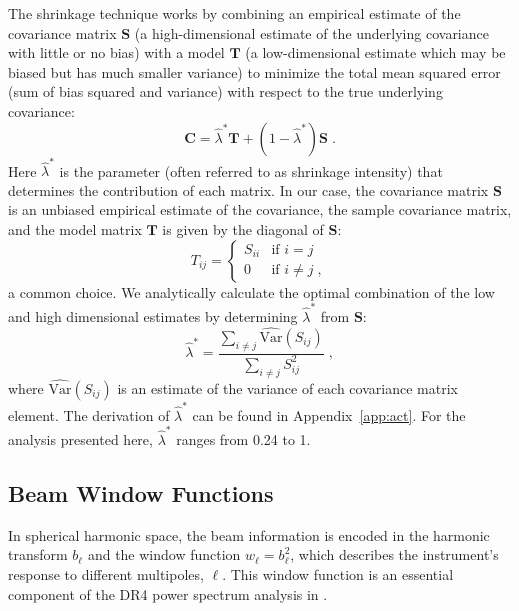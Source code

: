 The shrinkage technique works by combining an empirical estimate of the covariance matrix $\mathbf{S}$ (a high-dimensional estimate of the underlying covariance with little or no bias) with a model $\mathbf{T}$ (a low-dimensional estimate which may be biased but has much smaller variance) to minimize the total mean squared error (sum of bias squared and variance) with respect to the true underlying covariance: 
\begin{equation}
\label{eq:shrink_cov}
    \mathbf{C} = \widehat{\lambda}^{*}\mathbf{T} + (1-\widehat{\lambda}^{*})\mathbf{S} \; .
\end{equation}
Here $\widehat{\lambda}^{*}$ is the parameter (often referred to as shrinkage intensity) that determines the contribution of each matrix. In our case, the covariance matrix $\mathbf{S}$ is an unbiased empirical estimate of the covariance, the sample covariance matrix, and the model matrix $\mathbf{T}$ is given by the diagonal of $\mathbf{S}$:
\begin{equation}
\label{eq:target}
    T_{ij} = 
    \begin{cases}
    S_{ii} & \text{if $i=j$}\\
    0 & \text{if $i \neq j$} \; ,
    \end{cases}
\end{equation}
a common choice.
We analytically calculate the optimal combination of the low and high dimensional estimates by determining $\widehat{\lambda}^{*}$ from $\mathbf{S}$:
\begin{equation}
    \hat{\lambda}^* = \frac{\sum_{i\neq j}\widehat{\mathrm{Var}}(S_{ij})}{\sum_{i\neq j} S_{ij}^2}\; ,
\end{equation}
where $\widehat{\mathrm{Var}}(S_{ij})$ is an estimate of the variance of each covariance matrix element. The derivation of $\widehat{\lambda}^{*}$ can be found in Appendix~\ref{app:act}. For the analysis presented here, $\widehat{\lambda}^{*}$ ranges from 0.24 to 1.


\subsection{Beam Window Functions}
\label{subsec:window}

In spherical harmonic space, the beam information is encoded in the harmonic transform $b_{\ell}$ and the window function $w_{\ell} = b_{\ell}^2$, which describes the instrument's response to different multipoles, $\ell$. This window function is an essential component of the DR4 power spectrum analysis in \cite{choi_2020}.

